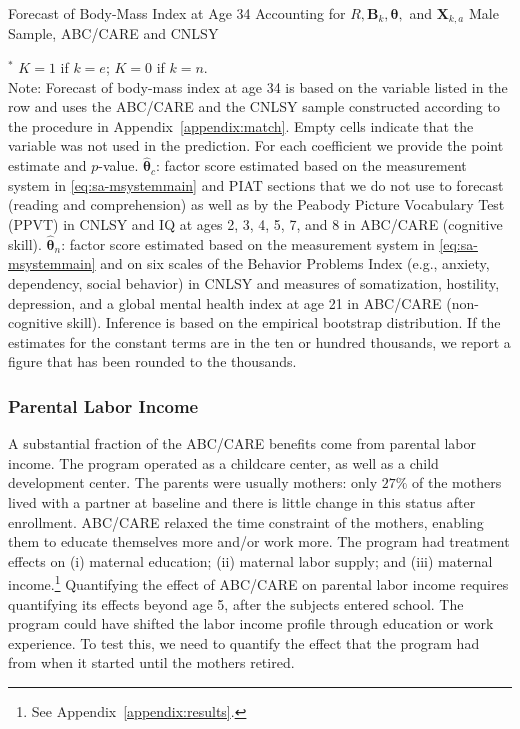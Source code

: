 \begin{table}
\begin{threeparttable}
\caption{Forecast of Body-Mass Index at Age 34 Accounting for $R, \bm{B}_k, \bm{\theta},$ and $\bm{X}_{k,a}$ Male Sample, ABC/CARE and CNLSY}
\label{table:invfin}
\centering
\scriptsize

\begin{tablenotes}
\footnotesize
\item $^\ast$ $K=1$ if $k=e$; $K=0$ if $k=n$.\\
Note: Forecast of body-mass index at age 34 is based on the variable listed in the row and uses the ABC/CARE and the CNLSY sample constructed according to the procedure in Appendix~\ref{appendix:match}. Empty cells indicate that the variable was not used in the prediction. For each coefficient we provide the point estimate and $p$-value. $\hat{\bm{\theta}}_{c}$: factor score estimated based on the measurement system in \eqref{eq:sa-msystemmain} and PIAT sections that we do not use to forecast (reading and comprehension) as well as by the Peabody Picture Vocabulary Test (PPVT) in CNLSY and IQ at ages 2, 3, 4, 5, 7, and 8 in ABC/CARE (cognitive skill). $\hat{\bm{\theta}}_{n}$: factor score estimated based on the measurement system in \eqref{eq:sa-msystemmain} and on six scales of the Behavior Problems Index (e.g., anxiety, dependency, social behavior) in CNLSY and measures of somatization, hostility, depression, and a global mental health index at age 21 in ABC/CARE (non-cognitive skill). Inference is based on the empirical bootstrap distribution. If the estimates for the constant terms are in the ten or hundred thousands, we report a figure that has been rounded to the thousands.
\end{tablenotes}
\end{threeparttable}
\end{table}

\subsubsection{Parental Labor Income}\label{app:parentalincome}

\noindent A substantial fraction of the ABC/CARE benefits come from parental labor income. The program operated as a childcare center, as well as a child development center. The parents were usually mothers: only $27\%$ of the mothers lived with a partner at baseline and there is little change in this status after enrollment. ABC/CARE relaxed the time constraint of the mothers, enabling them to educate themselves more and/or work more. The program had treatment effects on (i) maternal education; (ii) maternal labor supply; and (iii) maternal income.\footnote{See Appendix~\ref{appendix:results}.} Quantifying the effect of ABC/CARE on parental labor income requires quantifying its effects beyond age 5, after the subjects entered school. The program could have shifted the labor income profile through education or work experience. To test this, we need to quantify the effect that the program had from when it started until the mothers retired.\\

